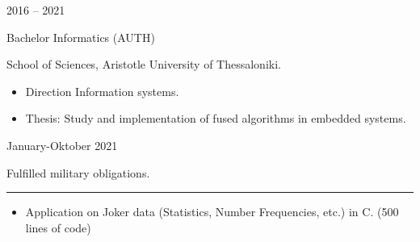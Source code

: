 \documentclass[a4paper,10pt]{article}
\newlength{\cvcolumngapwidth}
\newlength{\cvleftcolumnwidth}
\newlength{\cvrightcolumnwidth}
\newcommand{\cvsectionstyle}[1]{{\normalsize\cvsectionfont\textcolor{cvsectioncolor}{#1}}}
\newcommand{\cvtitlestyle}[1]{{\large\cvtitlefont\textcolor{cvtitlecolor}{#1}}}
\newcommand{\cvdurationstyle}[1]{{\small\cvdurationfont\textcolor{cvdurationcolor}{#1}}}
\newlength{\cvafteritemskipamount}
\newlength{\cvaftersectionskipamount}
\newlength{\cvaftertitleskipamount}
\newlength{\cvparskip}
\newcommand{\cvsection}[1]{
    \begin{minipage}[t]{\cvleftcolumnwidth}
        \raggedleft\cvsectionstyle{#1}
    \end{minipage}%
    \hspace{\cvcolumngapwidth}%
    \begin{minipage}[t]{\cvrightcolumnwidth}
        \textcolor{cvrulecolor}{\rule{\cvrightcolumnwidth}{0.3mm}}
    \end{minipage}

    \vspace{\cvaftersectionskipamount}
}
\newcommand{\cvitem}[2]{
    \begin{minipage}[t]{\cvleftcolumnwidth}
        \raggedleft #1
    \end{minipage}%
    \hspace{\cvcolumngapwidth}%
    \begin{minipage}[t]{\cvrightcolumnwidth}
        \setlength{\parskip}{\cvparskip} #2
    \end{minipage}

    \vspace{\cvafteritemskipamount}
}
\newcommand{\cvtitle}[1]{
    \cvtitlestyle{#1}

    \vspace{\cvaftertitleskipamount}
    \vspace{-\cvparskip}
}
\begin{document}
\cvitem{
    \cvdurationstyle{2016 -- 2021}
}{
    \cvtitle{Bachelor  Informatics (AUTH)}

     School of Sciences, Aristotle University of Thessaloniki.

    \begin{itemize}[leftmargin=*]
        \item Direction Information systems.
              
        \item Thesis:
        Study and implementation of fused algorithms in embedded systems.
    \end{itemize}

}



        

\cvitem{
    \cvdurationstyle{ January-Oktober 2021 }
    
}{
   Fulfilled  military obligations.

}

\cvsection{Projects}

\begin{itemize}[leftmargin=150pt]
        \item Application on Joker data (Statistics, Number Frequencies, etc.) in C. (500 lines of code)
        
\end{itemize}
\end{document}
